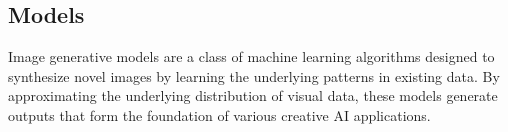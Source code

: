\documentclass[sn-mathphys]{sn-jnl}
\begin{document}
\subsection{Models}
\label{sec:models}






Image generative models are a class of machine learning algorithms designed to synthesize novel images by learning the underlying patterns in existing data. By approximating the underlying distribution of visual data, these models generate outputs that form the foundation of various creative AI applications.
\end{document}
